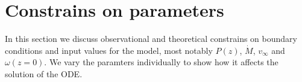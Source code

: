 \section{Constrains on parameters}
In this section we discuss observational and theoretical constrains on boundary conditions and input values for the model, most notably $P(z)$, $\dot M$, $v_\infty$ and $\omega(z=0)$. We vary the paramters individually to show how it affects the solution of the ODE.